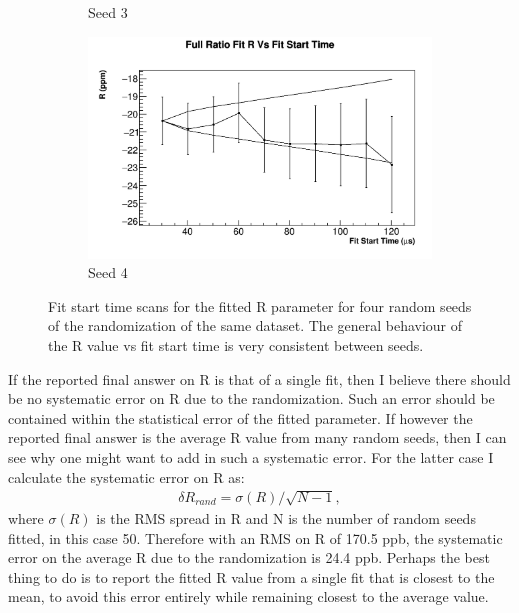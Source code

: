 \begin{figure}[]
\begin{subfigure}[t]{0.45\textwidth}
			    \caption{Seed 3}
		    \end{subfigure}
		    \begin{subfigure}[t]{0.45\textwidth}
			    \centering
				\includegraphics[width=\textwidth]{RatioCBO_R_FS_canv-Seed3}
			    \caption{Seed 4}
		    \end{subfigure}%
		\caption[RandomSeedFitStartScansR]{Fit start time scans for the fitted R parameter for four random seeds of the randomization of the same dataset. The general behaviour of the R value vs fit start time is very consistent between seeds.}
		\label{fig:RandomSeedFitStartScansR}
		\end{figure}

		If the reported final answer on R is that of a single fit, then I believe there should be no systematic error on R due to the randomization. Such an error should be contained within the statistical error of the fitted parameter. If however the reported final answer is the average R value from many random seeds, then I can see why one might want to add in such a systematic error. For the latter case I calculate the systematic error on R as:
			\begin{align}
				\delta R_{rand} = \sigma(R)/\sqrt{N-1},
			\label{Eqn:Rand}
			\end{align}
		where $\sigma(R)$ is the RMS spread in R and N is the number of random seeds fitted, in this case 50. Therefore with an RMS on R of 170.5 ppb, the systematic error on the average R due to the randomization is 24.4 ppb. Perhaps the best thing to do is to report the fitted R value from a single fit that is closest to the mean, to avoid this error entirely while remaining closest to the average value.

